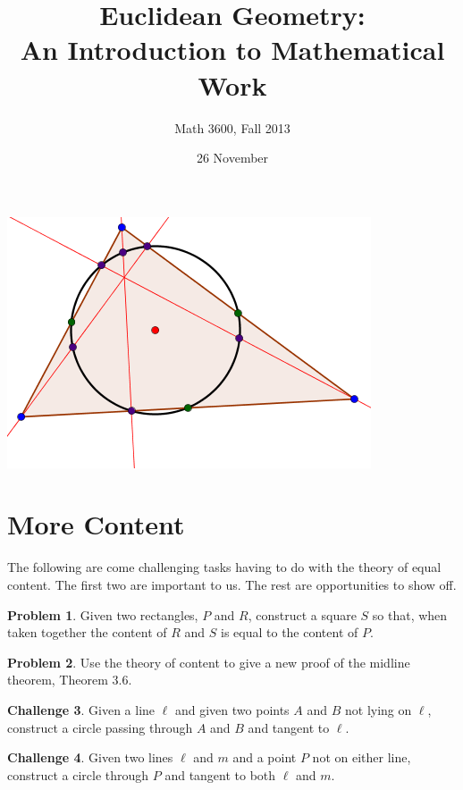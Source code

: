 \documentclass{tufte-handout}
\title{Euclidean Geometry:\\An Introduction to Mathematical Work}
\author[]{Math 3600, Fall 2013}
\date{26 November}
\theoremstyle{definition}
\newtheorem{problem}{Problem}[section]
\newtheorem{challenge}[problem]{Challenge}
\begin{document}
\maketitle

\begin{marginfigure}
    \includegraphics{NPC}
\end{marginfigure}

\setcounter{section}{14}
\section{More Content}

The following are come challenging tasks having to do with the theory of equal content.
The first two are important to us.
The rest are opportunities to show off.

\begin{problem}\label{prob:subtract-rect}
Given two rectangles, $P$ and $R$, construct a square $S$ so that, when taken together the content of $R$ and $S$ is equal to the content of $P$.
\end{problem}

\begin{problem} \label{conj:parallel-in-triangle} Use the theory of content to give a new proof of the midline theorem, Theorem 3.6.
\end{problem}

\begin{challenge}\label{chal:circle-given-two-points-tangent}
Given a line $\ell$ and given two points $A$ and $B$ not lying on $\ell$, construct a circle passing through $A$ and $B$ and tangent to $\ell$.
\end{challenge}

\begin{challenge}\label{chal:circle-point-two-tangents}
Given two lines $\ell$ and $m$ and a point $P$ not on either line, construct a circle through $P$ and tangent to both $\ell$ and $m$.
\end{challenge}
\end{document}

